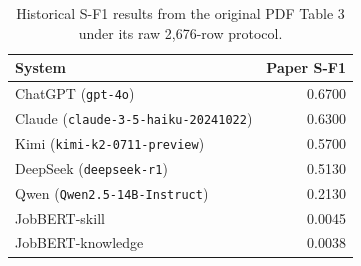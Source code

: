 \begin{table}[htbp]
\caption{Historical S-F1 results from the original PDF Table 3 under its raw 2,676-row protocol.}
\label{tab:paper-sf1}
\centering
\small
\begin{tabular}{lr}
\toprule
\textbf{System} & \textbf{Paper S-F1} \\
\midrule
ChatGPT (\texttt{gpt-4o}) & 0.6700 \\
Claude (\texttt{claude-3-5-haiku-20241022}) & 0.6300 \\
Kimi (\texttt{kimi-k2-0711-preview}) & 0.5700 \\
DeepSeek (\texttt{deepseek-r1}) & 0.5130 \\
Qwen (\texttt{Qwen2.5-14B-Instruct}) & 0.2130 \\
JobBERT-skill & 0.0045 \\
JobBERT-knowledge & 0.0038 \\
\bottomrule
\end{tabular}
\end{table}
